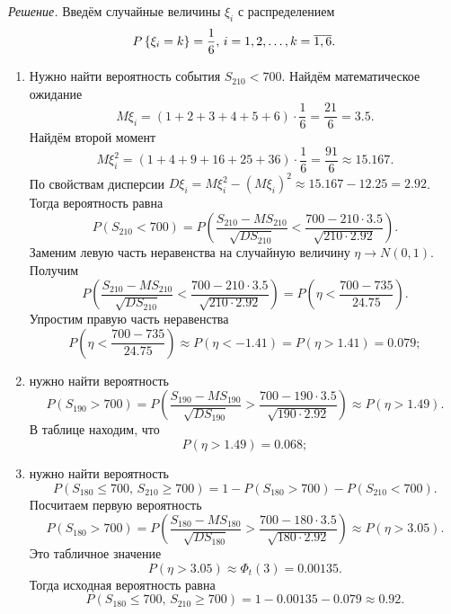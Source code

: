 \textit{Решение.} Введём случайные величины $ \xi_i$ с распределением
$$P \left\{ \xi_i = k \right\} = \frac{1}{6}, \,
  i = 1, 2, \dotsc, \\
  k = \overline{1, 6}.$$
\begin{enumerate}[label=\alph*)]
  \item Нужно найти вероятность события $S_{210} < 700$.
  Найдём математическое ожидание
  $$M \xi_i =
    \left( 1 + 2 + 3 + 4 + 5 + 6 \right) \cdot \frac{1}{6} =
    \frac{21}{6} =
    3.5.$$
  Найдём второй момент
  $$M \xi_i^2 =
    \left( 1 + 4 + 9 + 16 + 25 + 36 \right) \cdot \frac{1}{6} =
    \frac{91}{6} \approx
    15.167.$$
  По свойствам дисперсии
  $D \xi_i =
    M \xi_i^2 - \left( M \xi_i \right)^2 \approx 15.167 - 12.25 =
    2.92$.
  Тогда вероятность равна
  $$P \left( S_{210} < 700 \right) =
    P \left(
      \frac{S_{210} - MS_{210}}{ \sqrt{DS_{210}}} <
      \frac{700 - 210 \cdot 3.5}{ \sqrt{210 \cdot 2.92}}
    \right).$$
  Заменим левую часть неравенства на случайную величину $ \eta \to N \left( 0, 1 \right) $.
  Получим
  $$P \left(
      \frac{S_{210} - MS_{210}}{ \sqrt{DS_{210}}} <
      \frac{700 - 210 \cdot 3.5}{ \sqrt{210 \cdot 2.92}}
    \right) =
    P \left( \eta < \frac{700 - 735}{24.75} \right).$$
  Упростим правую часть неравенства
  $$P \left( \eta < \frac{700 - 735}{24.75} \right) \approx
    P \left( \eta < -1.41 \right) =
    P \left( \eta > 1.41 \right) =
    0.079;$$
  \item нужно найти вероятность
  $$P \left( S_{190} > 700 \right) =
    P \left(
      \frac{S_{190} - MS_{190}}{ \sqrt{DS_{190}}} >
      \frac{700 - 190 \cdot 3.5}{ \sqrt{190 \cdot 2.92}}
    \right) \approx
    P \left( \eta > 1.49 \right).$$
  В таблице находим, что
  $$P \left( \eta > 1.49 \right) =
    0.068;$$
  \item нужно найти вероятность
  $$P \left( S_{180} \leq 700, \, S_{210} \geq 700 \right) =
    1 - P \left( S_{180} > 700 \right) - P \left( S_{210} < 700 \right).$$
  Посчитаем первую вероятность
  $$P \left( S_{180} > 700 \right) =
    P \left(
      \frac{S_{180} - MS_{180}}{ \sqrt{DS_{180}}} >
      \frac{700 - 180 \cdot 3.5}{ \sqrt{180 \cdot 2.92}}
    \right) \approx
    P \left( \eta > 3.05 \right).$$
  Это табличное значение
  $$P \left( \eta > 3.05 \right) \approx
    \Phi_t \left( 3 \right) =
    0.00135.$$
  Тогда исходная вероятность равна
  $$P \left( S_{180} \leq 700, \, S_{210} \geq 700 \right) =
    1 - 0.00135 - 0.079 \approx
    0.92.$$
\end{enumerate}
